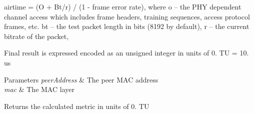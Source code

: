 airtime = (O + Bt/r) / (1 -\/ frame error rate), where o -- the P\+HY dependent channel access which includes frame headers, training sequences, access protocol frames, etc. bt -- the test packet length in bits (8192 by default), r -- the current bitrate of the packet,

Final result is expressed encoded as an unsigned integer in units of 0. TU = 10. us


\begin{DoxyParams}{Parameters}
{\em peer\+Address} & The peer M\+AC address \\
\hline
{\em mac} & The M\+AC layer \\
\hline
\end{DoxyParams}
\begin{DoxyReturn}{Returns}
the calculated metric in units of 0. TU 
\end{DoxyReturn}

